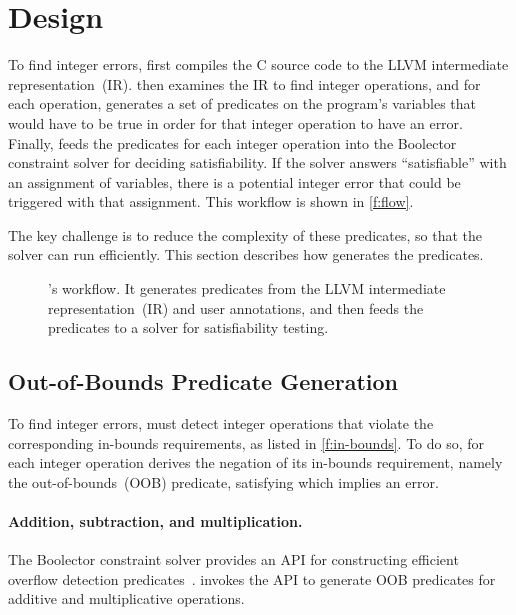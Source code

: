 \section{Design}
\label{s:gen}

To find integer errors, \sys first compiles the C source code to the
LLVM intermediate representation~(IR).  \sys then examines the IR to
find integer operations, and for each operation, \sys generates a
set of predicates on the program's variables that would have to be
true in order for that integer operation to have an error.  Finally,
\sys feeds the predicates for each integer operation into the
Boolector constraint solver for deciding satisfiability.  If the
solver answers ``satisfiable'' with an assignment of variables,
there is a potential integer error that could be triggered with
that assignment.  This workflow is shown in \autoref{f:flow}.

The key challenge is to reduce the complexity of these predicates,
so that the solver can run efficiently.  This section describes how
\sys generates the predicates.

\begin{figure}
\centering
\resizebox{\linewidth}{!}{

}
\caption{\sys's workflow.  It generates predicates from the LLVM
intermediate representation~(IR) and user annotations, and then feeds
the predicates to a solver for satisfiability testing.}
\label{f:flow}
\end{figure}

\subsection{Out-of-Bounds Predicate Generation}
\label{s:gen:oob}

To find integer errors, \sys must detect integer operations
that violate the corresponding in-bounds requirements, as listed
in \autoref{f:in-bounds}.  To do so, for each integer operation
\sys derives the negation of its in-bounds requirement, namely
the out-of-bounds~(OOB) predicate, satisfying which implies an error.

\paragraph{Addition, subtraction, and multiplication.}
The Boolector constraint solver provides an API for constructing
efficient overflow detection
predicates~\cite[\subsectionautorefname~3.5]{brummayer:phd}.
\sys invokes the API to generate OOB predicates for additive and
multiplicative operations.

